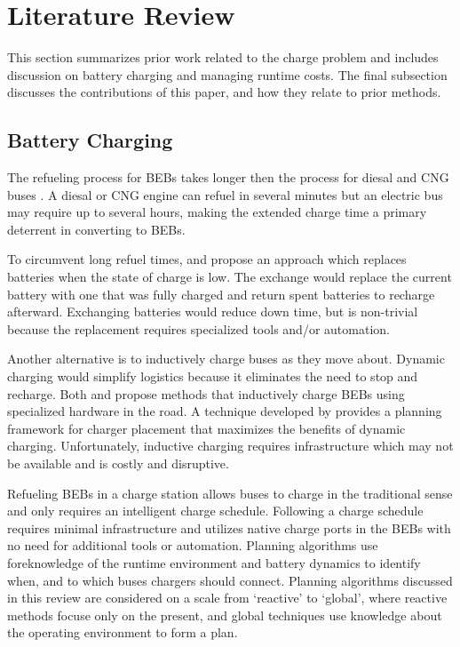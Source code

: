 \section{Literature Review}
\par This section summarizes prior work related to the charge problem and includes discussion on battery charging and managing runtime costs. The final subsection discusses the contributions of this paper, and how they relate to prior methods.
\subsection{Battery Charging}
The refueling process for BEBs takes longer then the process for diesal and CNG buses \cite{wei_optimizing_2018}. A diesal or CNG engine can refuel in several minutes but an electric bus may require up to several hours, making the extended charge time a primary deterrent in converting to BEBs.
\par To circumvent long refuel times, \cite{xian_zhang_optimal_2016} and \cite{jain_battery_2020} propose an approach which replaces batteries when the state of charge is low. The exchange would replace the current battery with one that was fully charged and return spent batteries to recharge afterward. Exchanging batteries would reduce down time, but is non-trivial because the replacement requires specialized tools and/or automation.  
\par Another alternative is to inductively charge buses as they move about. Dynamic charging would simplify logistics because it eliminates the need to stop and recharge. Both \cite{balde_electric_2019} and \cite{jeong_automatic_2018} propose methods that inductively charge BEBs using specialized hardware in the road. A technique developed by \cite{csonka_optimization_2021} provides a planning framework for charger placement that maximizes the benefits of dynamic charging. Unfortunately, inductive charging requires infrastructure which may not be available and is costly and disruptive.
\par Refueling BEBs in a charge station allows buses to charge in the traditional sense and only requires an intelligent charge schedule. Following a charge schedule requires minimal infrastructure and utilizes native charge ports in the BEBs with no need for additional tools or automation. Planning algorithms use foreknowledge of the runtime environment and battery dynamics to identify when, and to which buses chargers should connect. Planning algorithms discussed in this review are considered on a scale from `reactive' to `global', where reactive methods focuse only on the present, and global techniques use knowledge about the operating environment to form a plan.
